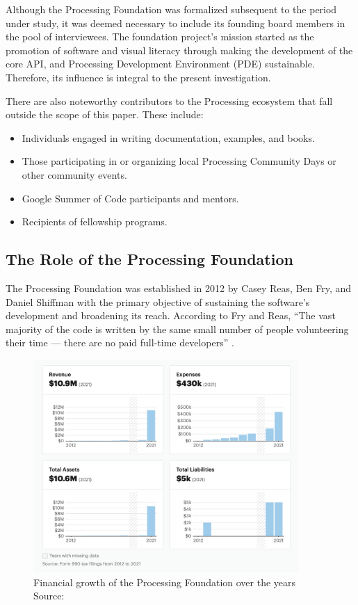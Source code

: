 \documentclass[draft]{article}
\begin{document}
Although the Processing Foundation was formalized subsequent to the period under study, it was deemed necessary to include its founding board members in the pool of interviewees. The foundation project’s mission started as the promotion of software and visual literacy through making the development of the core API, and Processing Development Environment (PDE) sustainable. Therefore, its influence is integral to the present investigation.\parencite{robertsProcessingFoundationForm2013}

There are also noteworthy contributors to the Processing ecosystem that fall outside the scope of this paper. These include:

\begin{itemize}
    \item Individuals engaged in writing documentation, examples, and books.
    \item Those participating in or organizing local Processing Community Days or other community events.
    \item Google Summer of Code participants and mentors.
    \item Recipients of fellowship programs.
\end{itemize}

\subsection{The Role of the Processing Foundation}

The Processing Foundation was established in 2012 by Casey Reas, Ben Fry, and Daniel Shiffman with the primary objective of sustaining the software's development and broadening its reach. According to Fry and Reas, ``The vast majority of the code is written by the same small number of people volunteering their time — there are no paid full-time developers'' \parencite[p.~13]{fryModernPrometheusHistory2018}.

\begin{figure}[h]
    \centering
    \includegraphics[width=0.9\textwidth]{images/foundation-finances.png} 
    \caption{Financial growth of the Processing Foundation over the years Source: \parencite{ProcessingFoundationNonprofit2013}}
    \label{fig:foundation-finances}
\end{figure}
\end{document}
